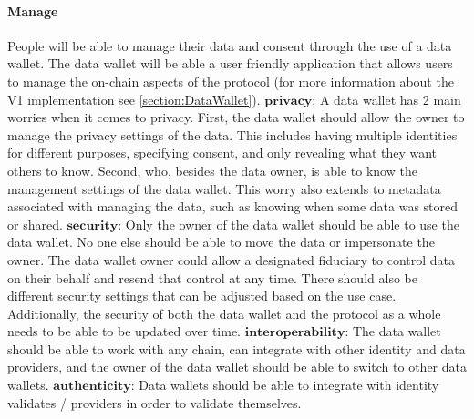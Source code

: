\paragraph{Manage} %
People will be able to manage their data and consent through the use of a data wallet. The data wallet will be able a user friendly application that allows users to manage the on-chain aspects of the protocol (for more information about the V1 implementation see \ref{section:DataWallet}). 
\newline
$\mathbf{privacy}$: 
A data wallet has 2 main worries when it comes to privacy. First, the data wallet should allow the owner to manage the privacy settings of the data. This includes having multiple identities for different purposes, specifying consent, and only revealing what they want others to know. Second, who, besides the data owner, is able to know the management settings of the data wallet. This worry also extends to metadata associated with managing the data, such as knowing when some data was stored or shared. 
\newline
$\mathbf{security}$:
Only the owner of the data wallet should be able to use the data wallet. No one else should be able to move the data or impersonate the owner. The data wallet owner could allow a designated fiduciary to control data on their behalf and resend that control at any time. There should also be different security settings that can be adjusted based on the use case. Additionally, the security of both the data wallet and the protocol as a whole needs to be able to be updated over time.
\newline
$\mathbf{interoperability}$:
The data wallet should be able to work with any chain, can integrate with other identity and data providers, and the owner of the data wallet should be able to switch to other data wallets.
\newline
$\mathbf{authenticity}$:
Data wallets should be able to integrate with identity validates / providers in order to validate themselves. %
